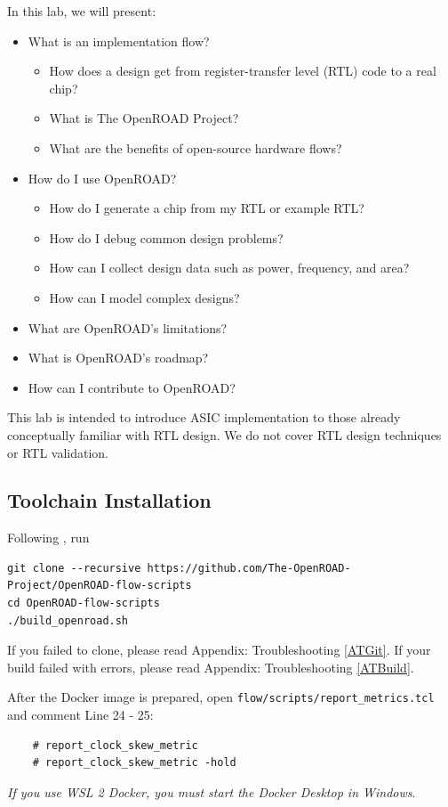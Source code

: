 \documentclass[a4paper,12pt,twoside]{article}
\begin{document}
In this lab, we will present:
\begin{itemize}
    \item What is an implementation flow?
    \begin{itemize}
        \item How does a design get from register-transfer level (RTL) code to a real chip?
        \item What is The OpenROAD Project?
        \item What are the benefits of open-source hardware flows?
    \end{itemize}
    \item How do I use OpenROAD?
    \begin{itemize}
        \item How do I generate a chip from my RTL or example RTL?
        \item How do I debug common design problems?
        \item How can I collect design data such as power, frequency, and area?
        \item How can I model complex designs?
    \end{itemize}
    \item What are OpenROAD’s limitations?
    \item What is OpenROAD’s roadmap?
    \item How can I contribute to OpenROAD?
\end{itemize}
This lab is intended to introduce ASIC implementation to those already conceptually familiar with RTL design. We do not cover RTL design techniques or RTL validation.

\subsection{Toolchain Installation}
Following \cite{openroadinstall}, run
\begin{verbatim}
git clone --recursive https://github.com/The-OpenROAD-Project/OpenROAD-flow-scripts
cd OpenROAD-flow-scripts
./build_openroad.sh
\end{verbatim}
If you failed to clone, please read Appendix: Troubleshooting \ref{ATGit}. If your build failed with errors, please read Appendix: Troubleshooting \ref{ATBuild}.

After the Docker image is prepared, open \texttt{flow/scripts/report\_metrics.tcl} and comment Line 24 - 25:
\begin{verbatim}
    # report_clock_skew_metric
    # report_clock_skew_metric -hold
\end{verbatim}
\textit{If you use WSL 2 Docker, you must start the Docker Desktop in Windows}.
\end{document}
